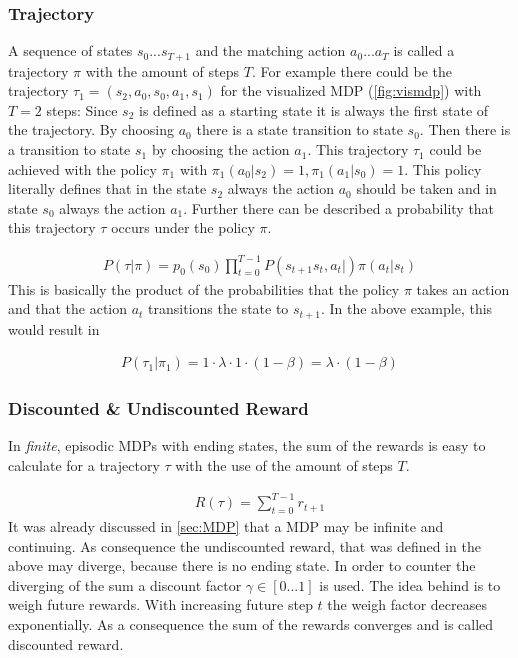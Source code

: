 \subsubsection{Trajectory}
A sequence of states $s_0 ... s_{T+1}$ and the matching action $a_0 ... a_T$ is called a trajectory $\pi$ with the amount of steps $T$.
For example there could be the trajectory $\tau_1 = (s_2, a_0, s_0, a_1, s_1)$ for the visualized MDP (\cref{fig:vismdp}) with $T=2$ steps:
Since $s_2$ is defined as a starting state it is always the first state of the trajectory. 
By choosing $a_0$ there is a state transition to state $s_0$. Then there is a transition to state $s_1$ by choosing the action $a_1$. 
This trajectory $\tau_1$ could be achieved with the policy $\pi_1$ with $\pi_1(a_0|s_2) = 1, \pi_1(a_1|s_0) = 1$. 
This policy literally defines that in the state $s_2$ always the action $a_0$ should be taken and in state $s_0$ always the action $a_1$.
Further there can be described a probability that this trajectory $\tau$ occurs under the policy $\pi$.

\begin{align}
	P(\tau| \pi) = p_0(s_0)  \prod_{t=0}^{T-1} P(s_{t+1}s_t,a_t|) \pi (a_t|s_t) 
\end{align}
\newline
This is basically the product of the probabilities that the policy $\pi$ takes an action and that the action $a_t$ transitions the state to $s_{t+1}$. 
In the above example, this would result in

\begin{align*}
	P(\tau_1|\pi_1) = 1 \cdot \lambda \cdot 1 \cdot (1-\beta) = \lambda \cdot (1-\beta)
\end{align*} 

\newpage

\subsubsection{Discounted \& Undiscounted Reward}
In \emph{finite}, episodic MDPs with ending states, the sum of the rewards is easy to calculate for a trajectory $\tau$ with the use of the amount of steps $T$.

\begin{align}
	R(\tau) = \sum_{t=0}^{T-1}r_{t+1}
\end{align}
\newline
It was already discussed in \cref{sec:MDP} that a MDP may be infinite and continuing. 
As consequence the undiscounted reward, that was defined in the above may diverge, because there is no ending state. 
In order to counter the diverging of the sum a discount factor $\gamma \in [0...1]$ is used. 
The idea behind is to weigh future rewards. With increasing future step $t$ the weigh factor decreases exponentially. 
As a consequence the sum of the rewards converges and is called discounted reward.

